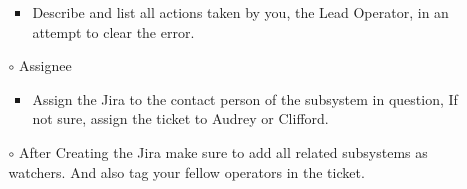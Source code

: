 \begin{itemize}
\begin{itemize}
\begin{itemize}
\item Describe and list all actions taken by you, the Lead Operator, in an attempt to clear the error.
\end{itemize}
\item[$\circ$] Assignee
\begin{itemize}
\item Assign the Jira to the contact person of the subsystem in question, If not sure, assign the ticket to Audrey or Clifford.
\end{itemize}
\item[$\circ$] After Creating the Jira make sure to add all related subsystems as watchers. And also tag your fellow operators in the ticket. 
\end{itemize}
\end{itemize}


